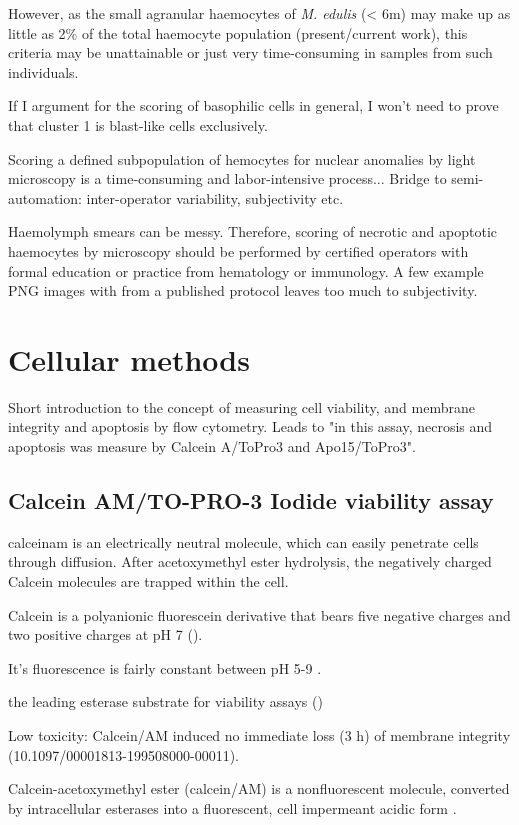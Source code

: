 However, as the small agranular haemocytes of \emph{M. edulis} (< 6\micro m) may make up as little as 2\% of the total haemocyte population (present/current work), this criteria may be unattainable or just very time-consuming in samples from such individuals.

If I argument for the scoring of basophilic cells in general, I won't need to prove that cluster 1 is blast-like cells exclusively.

Scoring a defined subpopulation of hemocytes for nuclear anomalies by light microscopy is a time-consuming and labor-intensive process... Bridge to semi-automation: inter-operator variability, subjectivity etc.

Haemolymph smears can be messy. Therefore, scoring of necrotic and apoptotic haemocytes by microscopy should be performed by certified operators with formal education or practice from hematology or immunology. A few example PNG images with from a published protocol leaves too much to subjectivity. 


\section{Cellular methods}
Short introduction to the concept of measuring cell viability, and membrane integrity and apoptosis by flow cytometry. Leads to "in this assay, necrosis and apoptosis was measure by Calcein A/ToPro3 and Apo15/ToPro3".

\subsection{Calcein AM/TO-PRO-3 Iodide viability assay} 

\acrshort{calceinam} is an electrically neutral molecule, which can easily penetrate cells through diffusion. After acetoxymethyl ester hydrolysis, the negatively charged Calcein molecules are trapped within the cell.

Calcein is a polyanionic fluorescein derivative that bears five negative charges and two positive charges at pH 7 (\cite{Wallach1959}).

It's fluorescence is fairly constant between pH 5-9 \cite{Chiu1977}.

the leading esterase substrate for viability assays (\cite{Ramirez2010})

Low toxicity: Calcein/AM induced no immediate loss (3 h) of membrane integrity (10.1097/00001813-199508000-00011).

Calcein-acetoxymethyl ester (calcein/AM) is a nonfluorescent molecule, converted by intracellular esterases into a fluorescent, cell impermeant acidic form \cite{Uggeri2000}.

